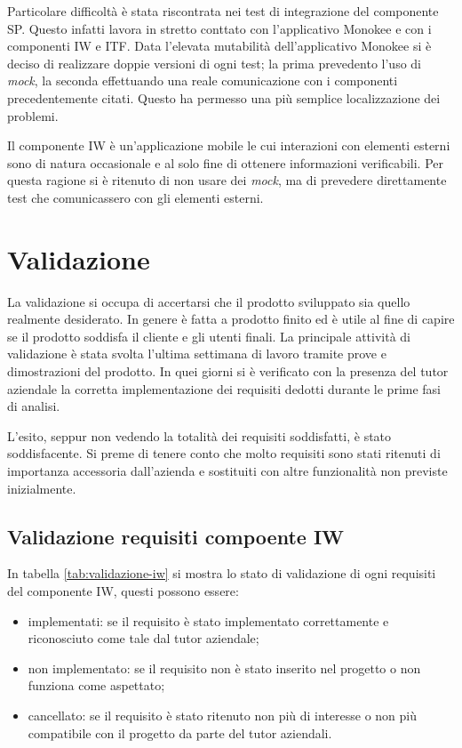 Particolare difficoltà è stata riscontrata nei test di integrazione del componente SP. Questo infatti lavora in stretto conttato con l'applicativo Monokee e con i componenti IW e ITF. Data l'elevata mutabilità dell'applicativo Monokee si è deciso di realizzare doppie versioni di ogni test; la prima prevedento l'uso di \emph{mock}, la seconda  effettuando una reale comunicazione con i componenti precedentemente citati. Questo ha permesso una più semplice localizzazione dei problemi.

Il componente IW è un'applicazione mobile le cui interazioni con elementi esterni sono di natura occasionale e al solo fine di ottenere informazioni verificabili. Per questa ragione si è ritenuto di non usare dei \emph{mock}, ma di prevedere direttamente test che comunicassero con gli elementi esterni.


\section{Validazione}
La validazione si occupa di accertarsi che il prodotto sviluppato sia quello realmente desiderato. In genere è fatta a prodotto finito ed è utile al fine di capire se il prodotto soddisfa il cliente e gli utenti finali. La principale attività di validazione è stata svolta l'ultima settimana di lavoro tramite prove e dimostrazioni del prodotto. In quei giorni si è verificato con la presenza del tutor aziendale la corretta implementazione dei requisiti dedotti durante le prime fasi di analisi.

L'esito, seppur non vedendo la totalità dei requisiti soddisfatti, è stato soddisfacente. Si preme di tenere conto che molto requisiti sono stati ritenuti di importanza accessoria dall'azienda e sostituiti con altre funzionalità non previste inizialmente.


\subsection{Validazione requisiti compoente IW}
In tabella \ref{tab:validazione-iw} si mostra lo stato di validazione di ogni requisiti del componente IW, questi possono essere:
\begin{itemize}
    \item implementati: se il requisito è stato implementato correttamente e riconosciuto come tale dal tutor aziendale;
    \item non implementato: se il requisito non è stato inserito nel progetto o non funziona come aspettato;
    \item cancellato: se il requisito è stato ritenuto non più di interesse o non più compatibile con il progetto da parte del tutor aziendali.
\end{itemize}

